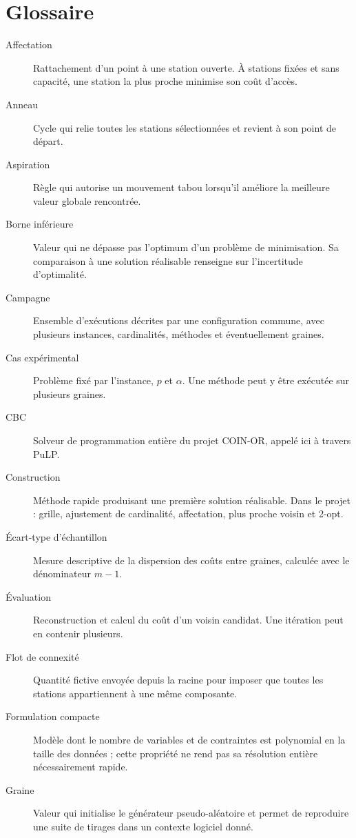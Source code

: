 \chapter*{Glossaire}
\begin{description}
\item[Affectation] Rattachement d'un point à une station ouverte. À stations
fixées et sans capacité, une station la plus proche minimise son coût d'accès.
\item[Anneau] Cycle qui relie toutes les stations sélectionnées et revient
à son point de départ.
\item[Aspiration] Règle qui autorise un mouvement tabou lorsqu'il améliore
la meilleure valeur globale rencontrée.
\item[Borne inférieure] Valeur qui ne dépasse pas l'optimum d'un problème
de minimisation. Sa comparaison à une solution réalisable renseigne
sur l'incertitude d'optimalité.
\item[Campagne] Ensemble d'exécutions décrites par une configuration commune,
avec plusieurs instances, cardinalités, méthodes et éventuellement graines.
\item[Cas expérimental] Problème fixé par l'instance, $p$ et $\alpha$.
Une méthode peut y être exécutée sur plusieurs graines.
\item[CBC] Solveur de programmation entière du projet COIN-OR,
appelé ici à travers PuLP.
\item[Construction] Méthode rapide produisant une première solution réalisable.
Dans le projet : grille, ajustement de cardinalité, affectation, plus proche
voisin et 2-opt.
\item[Écart-type d'échantillon] Mesure descriptive de la dispersion des coûts
entre graines, calculée avec le dénominateur $m-1$.
\item[Évaluation] Reconstruction et calcul du coût d'un voisin candidat.
Une itération peut en contenir plusieurs.
\item[Flot de connexité] Quantité fictive envoyée depuis la racine pour imposer
que toutes les stations appartiennent à une même composante.
\item[Formulation compacte] Modèle dont le nombre de variables et de contraintes
est polynomial en la taille des données ; cette propriété ne rend pas
sa résolution entière nécessairement rapide.
\item[Graine] Valeur qui initialise le générateur pseudo-aléatoire et permet
de reproduire une suite de tirages dans un contexte logiciel donné.

\end{description}
